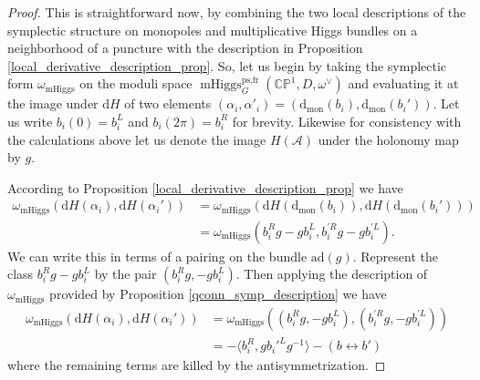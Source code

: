 \documentclass[11pt, oneside, reqno]{amsart}
\theoremstyle{definition} \newtheorem{definition}{Definition}[section]
\theoremstyle{definition} \newtheorem{remark}[definition]{Remark}
\theoremstyle{definition} \newtheorem{remarks}[definition]{Remarks}
\theoremstyle{definition} \newtheorem{question}[definition]{Question}
\theoremstyle{definition} \newtheorem*{note}{Note}
\theoremstyle{definition} \newtheorem{example}[definition]{Example}
\theoremstyle{definition} \newtheorem{examples}[definition]{Examples}
\newcommand{\bb}[1]{\mathbb{#1}}
\newcommand{\mr}[1]{\mathrm{#1}}
\newcommand{\mc}[1]{\mathcal{#1}}
\DeclareMathOperator{\mhiggs}{mHiggs}
\renewcommand{\d}{\mathrm{d}}
\newcommand{\ad}{\mr{ad}}
\begin{document}
\begin{proof}
This is straightforward now, by combining the two local descriptions of the symplectic structure on monopoles and multiplicative Higgs bundles on a neighborhood of a puncture with the description in Proposition \ref{local_derivative_description_prop}.  So, let us begin by taking the symplectic form $\omega_{\mr{mHiggs}}$ on the moduli space $\mhiggs_G^{\text{ps,fr}}(\bb{CP}^1,D,\omega^\vee)$ and evaluating it at the image under $\d H$ of two elements $(\alpha_i, \alpha'_i) = (\d_{\mr{mon}}(b_i), \d_{\mr{mon}}(b_i'))$.  Let us write $b_i(0) = b_i^L$ and $b_i(2\pi) = b_i^R$ for brevity.  Likewise for consistency with the calculations above let us denote the image $H(\mc A)$ under the holonomy map by $g$.

According to Proposition \ref{local_derivative_description_prop} we have
\begin{align*}
\omega_{\mr{mHiggs}}(\d H(\alpha_i), \d H(\alpha_i')) &= \omega_{\mr{mHiggs}}(\d H(\d_{\mr{mon}}(b_i)), \d H(\d_{\mr{mon}}(b_i'))) \\
&= \omega_{\mr{mHiggs}}(b_i^Rg - gb_i^L,b_i^{'R}g - gb_i^{'L}).
\end{align*}
We can write this in terms of a pairing on the bundle $\ad(g)$.  Represent the class $b_i^Rg - gb_i^L$ by the pair $(b_i^Rg, -gb_i^L)$.  Then applying the description of $\omega_{\mr{mHiggs}}$ provided by Proposition \ref{qconn_symp_description} we have
\begin{align*}
\omega_{\mr{mHiggs}}(\d H(\alpha_i), \d H(\alpha_i')) &= \omega_{\mr{mHiggs}}((b_i^Rg, -gb_i^L),(b_i^{'R}g, -gb_i^{'L})) \\ 
&= - \langle  b_i^R , g b_i'^L g^{-1}\rangle - (b \leftrightarrow b')
\end{align*}
where the remaining terms are killed by the antisymmetrization.


\end{proof}
\end{document}
